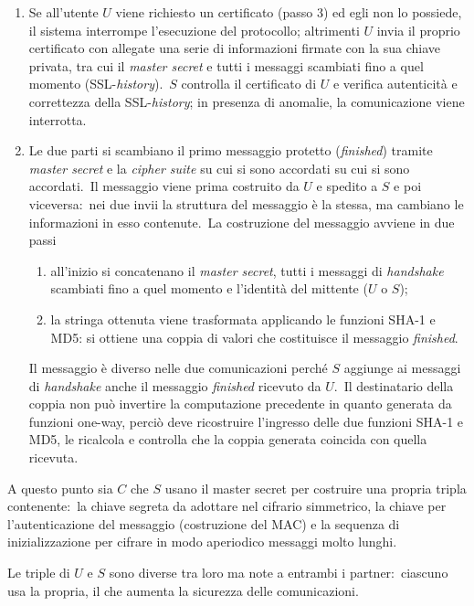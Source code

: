 \begin{enumerate}
    \item Se all'utente $U$ viene richiesto un certificato (passo 3) ed egli non lo possiede, il sistema interrompe l'esecuzione del protocollo; altrimenti $U$ invia il proprio certificato con allegate una serie di informazioni firmate con la sua chiave privata, tra cui il \textit{master secret} e tutti i messaggi scambiati fino a quel momento (SSL-\textit{history}).\ $S$ controlla il certificato di $U$ e verifica autenticità e correttezza della SSL-\textit{history}; in presenza di anomalie, la comunicazione viene interrotta.\
    \item Le due parti si scambiano il primo messaggio protetto (\textit{finished}) tramite \textit{master secret} e la \textit{cipher suite} su cui si sono accordati su cui si sono accordati.\ Il messaggio viene prima costruito da $U$ e spedito a $S$ e poi viceversa:\ nei due invii la struttura del messaggio è la stessa, ma cambiano le informazioni in esso contenute.\ La costruzione del messaggio avviene in due passi
          \begin{enumerate}
              \item all'inizio si concatenano il \textit{master secret}, tutti i messaggi di \textit{handshake} scambiati fino a quel momento e l'identità del mittente ($U$ o $S$);
              \item la stringa ottenuta viene trasformata applicando le funzioni SHA-1 e MD5: si ottiene una coppia di valori che costituisce il messaggio \textit{finished}.
          \end{enumerate}
          Il messaggio è diverso nelle due comunicazioni perché $S$ aggiunge ai messaggi di \textit{handshake} anche il messaggio \textit{finished} ricevuto da $U$.\ Il destinatario della coppia non può invertire la computazione precedente in quanto generata da funzioni one-way, perciò deve ricostruire l'ingresso delle due funzioni SHA-1 e MD5, le ricalcola e controlla che la coppia generata coincida con quella ricevuta.\
\end{enumerate}

\noindent A questo punto sia $C$ che $S$ usano il master secret per costruire una propria tripla contenente:\ la chiave segreta da adottare nel cifrario simmetrico, la chiave per l'autenticazione del messaggio (costruzione del MAC) e la sequenza di inizializzazione per cifrare in modo aperiodico messaggi molto lunghi.\

Le triple di $U$ e $S$ sono diverse tra loro ma note a entrambi i partner:\ ciascuno usa la propria, il che aumenta la sicurezza delle comunicazioni.\


